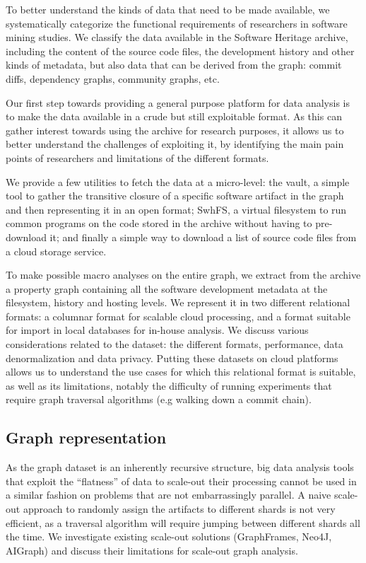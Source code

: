 To better understand the kinds of data that need to be made available, we
systematically categorize the functional requirements of researchers in
software mining studies.  We classify the data available in the Software
Heritage archive, including the content of the source code files, the
development history and other kinds of metadata, but also data that can be
derived from the graph: commit diffs, dependency graphs, community graphs, etc.

Our first step towards providing a general purpose platform for data analysis
is to make the data available in a crude but still exploitable format. As this
can gather interest towards using the archive for research purposes, it
allows us to better understand the challenges of exploiting it, by identifying
the main pain points of researchers and limitations of the different formats.

We provide a few utilities to fetch the data at a micro-level: the vault, a
simple tool to gather the transitive closure of a specific software artifact in
the graph and then representing it in an open format; SwhFS, a virtual
filesystem to run common programs on the code stored in the archive without
having to pre-download it; and finally a simple way to download a list of
source code files from a cloud storage service.

To make possible macro analyses on the entire graph, we extract from the
archive a property graph containing all the software development metadata at
the filesystem, history and hosting levels. We represent it in two different
relational formats: a columnar format for scalable cloud processing, and a
format suitable for import in local databases for in-house analysis. We discuss
various considerations related to the dataset: the different formats,
performance, data denormalization and data privacy.
Putting these datasets on cloud platforms allows us to understand the use cases
for which this relational format is suitable, as well as its limitations,
notably the difficulty of running experiments that require graph traversal
algorithms (e.g walking down a commit chain).

\subsection*{Graph representation}

As the graph dataset is an inherently recursive structure, big data analysis
tools that exploit the ``flatness'' of data to scale-out their processing cannot
be used in a similar fashion on problems that are not embarrassingly parallel.
A naive scale-out approach to randomly assign the artifacts to different shards
is not very efficient, as a traversal algorithm will require jumping
between different shards all the time. We investigate existing scale-out
solutions (GraphFrames, Neo4J, AIGraph) and discuss their limitations for
scale-out graph analysis.

